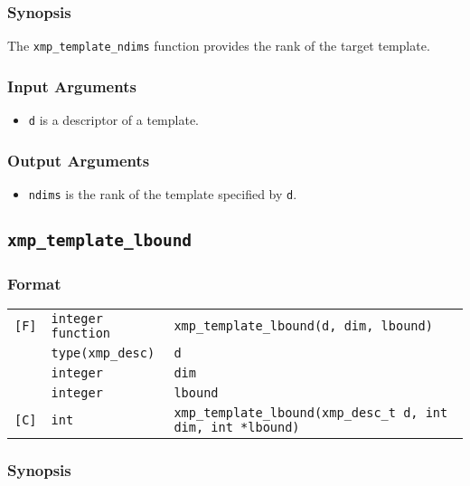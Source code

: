 \subsubsection*{Synopsis}

The {\tt xmp\_template\_ndims} function provides the rank of the target
template.


\subsubsection*{Input Arguments}
\begin{itemize}
 \item {\tt d} is a descriptor of a template.
\end{itemize}

\subsubsection*{Output Arguments}
\begin{itemize}
 \item {\tt ndims} is the rank of the template specified by {\tt d}.
\end{itemize}


\subsection{\tt xmp\_template\_lbound}

\subsubsection*{Format}

\begin{tabular}{lll}

\verb![F]!& {\tt integer function}& {\tt xmp\_template\_lbound(d, dim, lbound)}\\
          & {\tt type(xmp\_desc)} & {\tt d}\\
          & {\tt integer} & {\tt dim}\\
          & {\tt integer} & {\tt lbound}\\

\verb![C]!&  {\tt int}& {\tt xmp\_template\_lbound(xmp\_desc\_t d, int dim, int *lbound)}\\

\end{tabular}

\subsubsection*{Synopsis}

